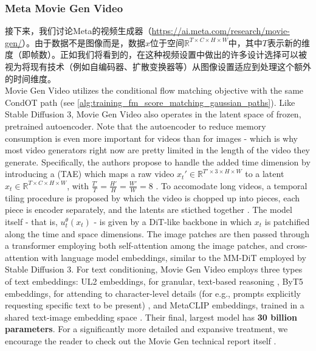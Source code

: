 \subsubsection{Meta Movie Gen Video}
接下来，我们讨论Meta的视频生成器（\url{https://ai.meta.com/research/movie-gen/}）。由于数据不是图像而是，数据$x$位于空间$\mathbb{R}^{T \times C \times H \times W}$中，其中$T$表示新的维度（即帧数）。正如我们将看到的，在这种视频设置中做出的许多设计选择可以被视为将现有技术（例如自编码器、扩散变换器等）从图像设置适应到处理这个额外的时间维度。\\

Movie Gen Video utilizes the conditional flow matching objective with the same CondOT path (see \cref{alg:training_fm_score_matching_gaussian_paths}). Like Stable Diffusion 3, Movie Gen Video also operates in the latent space of frozen, pretrained autoencoder. Note that the autoencoder to reduce memory consumption is even more important for videos than for images - which is why most video generators right now are pretty limited in the length of the video they generate.
Specifically, the authors propose to handle the added time dimension by introducing a  (TAE) which maps a raw video $x_t' \in \mathbb{R}^{T' \times 3 \times H \times W}$ to a latent $x_t\in\mathbb{R}^{T \times C \times H \times W}$, with $\tfrac{T'}{T} = \tfrac{H'}{H} = \tfrac{W'}{W} = 8$ \cite{moviegen}. To accomodate long videos, a temporal tiling procedure is proposed by which the video is chopped up into pieces, each piece is encoder separately, and the latents are sticthed together \cite{moviegen}. The model itself - that is, $u_t^\theta(x_t)$ - is given by a DiT-like backbone in which $x_t$ is patchified along the time and space dimensions. The image patches are then passed through a transformer employing both self-attention among the image patches, and cross-attention with language model embeddings, similar to the MM-DiT employed by Stable Diffusion 3. For text conditioning, Movie Gen Video employs three types of text embeddings: UL2 embeddings, for granular, text-based reasoning \cite{ul2}, ByT5 embeddings, for attending to character-level details (for e.g., prompts explicitly requesting specific text to be present) \cite{byte5}, and MetaCLIP embeddings, trained in a shared text-image embedding space \cite{metaclip, moviegen}. Their final, largest model has \textbf{30 billion parameters}. For a significantly more detailed and expansive treatment, we encourage the reader to check out the Movie Gen technical report itself \citep{moviegen}.

